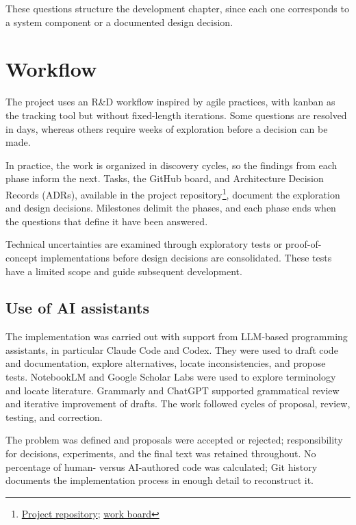 These questions structure the development chapter, since each one corresponds to a system component or a documented design decision.

\section{Workflow}

The project uses an R\&D workflow inspired by agile practices, with kanban as the tracking tool but without fixed-length iterations. Some questions are resolved in days, whereas others require weeks of exploration before a decision can be made.

In practice, the work is organized in discovery cycles, so the findings from each phase inform the next. Tasks, the GitHub board, and Architecture Decision Records (ADRs), available in the project repository\footnote{\href{https://github.com/magrimal/tfm-2026-discussion-moderation}{Project repository}; \href{https://github.com/users/magrimal/projects/3/views/1}{work board}}, document the exploration and design decisions. Milestones delimit the phases, and each phase ends when the questions that define it have been answered.

Technical uncertainties are examined through exploratory tests or proof-of-concept implementations before design decisions are consolidated. These tests have a limited scope and guide subsequent development.

\subsection{Use of AI assistants}

The implementation was carried out with support from LLM-based programming assistants, in particular Claude Code and Codex. They were used to draft code and documentation, explore alternatives, locate inconsistencies, and propose tests. NotebookLM and Google Scholar Labs were used to explore terminology and locate literature. Grammarly and ChatGPT supported grammatical review and iterative improvement of drafts. The work followed cycles of proposal, review, testing, and correction.

The problem was defined and proposals were accepted or rejected; responsibility for decisions, experiments, and the final text was retained throughout. No percentage of human- versus AI-authored code was calculated; Git history documents the implementation process in enough detail to reconstruct it.

